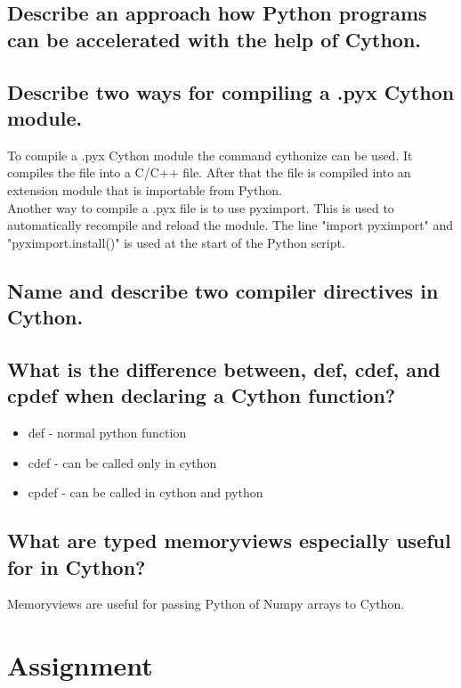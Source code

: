 \documentclass[runningheads]{llncs}
\begin{document}
\subsection{Describe an approach how Python programs can be accelerated with the help of Cython.}

\subsection{Describe two ways for compiling a .pyx Cython module.}
To compile a .pyx Cython module the command cythonize can be used. 
It compiles the file into a C/C++ file.
After that the file is compiled into an extension module that is importable from Python.
\\
Another way to compile a .pyx file is to use pyximport. 
This is used to automatically recompile and reload the module.
The line "import pyximport" and "pyximport.install()" is used at the start of the Python script.

\subsection{Name and describe two compiler directives in Cython.}

\subsection{What is the difference between, def, cdef, and cpdef when declaring a Cython function?}
\begin{itemize}
	\item def - normal python function
	\item cdef - can be called only in cython
	\item cpdef - can be called in cython and python
\end{itemize}

\subsection{What are typed memoryviews especially useful for in Cython?}
Memoryviews are useful for passing Python of Numpy arrays to Cython.


\section{Assignment}
\end{document}
